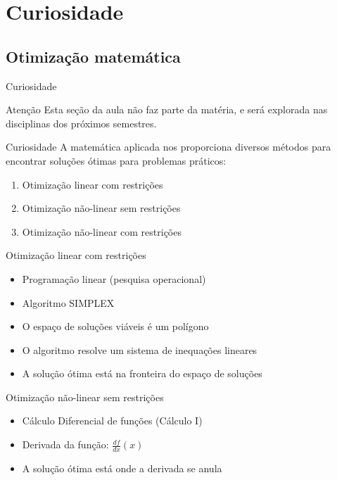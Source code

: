 \documentclass{beamer}
\begin{document}
\section{Curiosidade}
\subsection{Otimização matemática}

\begin{frame}{Curiosidade}
  \begin{block}{Atenção}
    Esta seção da aula não faz parte da matéria, e será explorada nas disciplinas dos próximos semestres.
  \end{block}
\end{frame}

\begin{frame}{Curiosidade}
A matemática aplicada nos proporciona diversos métodos para encontrar soluções ótimas para problemas práticos:

  \begin{enumerate}
  \item<2-> Otimização linear com restrições
  \item<3-> Otimização não-linear sem restrições
  \item<4-> Otimização não-linear com restrições
  \end{enumerate}
\end{frame}

\begin{frame}{Otimização linear com restrições}
  \begin{itemize}
  \item Programação linear (pesquisa operacional)
  \item Algoritmo SIMPLEX
  \item O espaço de soluções viáveis é um polígono
  \item O algoritmo resolve um sistema de inequações lineares
  \item A solução ótima está na fronteira do espaço de soluções
  \end{itemize}
\end{frame}

\begin{frame}{Otimização não-linear sem restrições}
  \begin{itemize}
  \item Cálculo Diferencial de funções (Cálculo I)
  \item Derivada da função: $\frac{d f}{d x}(x)$
  \item A solução ótima está onde a derivada se anula
  \end{itemize}
\end{frame}
\end{document}
